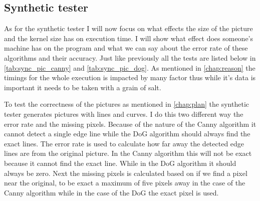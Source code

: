 \subsection{Synthetic tester}
\label{chap:test_synt_test}

As for the synthetic tester I will now focus on what effects the size of the picture and the kernel size has on execution time. I will show what effect does someone's machine has on the program and what we can say about the error rate of these algorithms and their accuracy. Just like previously all the tests are listed below in \autoref{tab:sync_pic_canny} and \autoref{tab:sync_pic_dog}. As mentioned in \autoref{chap:reason} the timings for the whole execution is impacted by many factor thus while it's data is important it needs to be taken with a grain of salt.
	
To test the correctness of the pictures as mentioned in \autoref{chap:plan} the synthetic tester generates pictures with lines and curves. I do this two different way the error rate and the missing pixels. Because of the nature of the \ac{Canny} algorithm it cannot detect a single edge line while the \ac{DoG} algorithm should always find the exact lines. The error rate is used to calculate how far away the detected edge lines are from the original picture. In the \ac{Canny} algorithm this will not be exact because it cannot find the exact line. While in the \ac{DoG} algorithm it should always be zero. Next the missing pixels is calculated based on if we find a pixel near the original, to be exact a maximum of five pixels away in the case of the \ac{Canny} algorithm while in the case of the \ac{DoG} the exact pixel is used.

\begin{table}[H]
\centering
{}
\caption{Test plans for the  Synthetic tester for \ac{Canny} algorithm}
\label{tab:sync_pic_canny}
\end{table}

